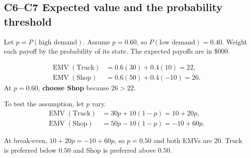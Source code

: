 \subsection*{C6--C7 \textemdash{} Expected value and the probability threshold}
Let \(p=P(\text{high demand})\). Assume \(p=0.60\), so \(P(\text{low demand})=0.40\). Weight each payoff by the probability of its state. The expected payoffs are in \$000.

\noindent
\begin{minipage}[c]{0.48\linewidth}
\small
\setlength{\abovedisplayskip}{4pt}
\setlength{\belowdisplayskip}{4pt}
\[
\begin{aligned}
\operatorname{EMV}(\text{Truck}) &= 0.6(30)+0.4(10)=22,\\
\operatorname{EMV}(\text{Shop})  &= 0.6(50)+0.4(-10)=26.
\end{aligned}
\]
At \(p=0.60\), \textbf{choose Shop} because \(26>22\).

To test the assumption, let \(p\) vary.
\[
\begin{aligned}
\operatorname{EMV}(\text{Truck}) &= 30p+10(1-p)=10+20p,\\
\operatorname{EMV}(\text{Shop})  &= 50p-10(1-p)=-10+60p.
\end{aligned}
\]
\end{minipage}\hfill
\begin{minipage}[c]{0.50\linewidth}
\centering
{}
\end{minipage}\par

At break-even, \(10+20p=-10+60p\), so \(p=0.50\) and both EMVs are 20.
Truck is preferred below \(0.50\) and Shop is preferred above \(0.50\).

